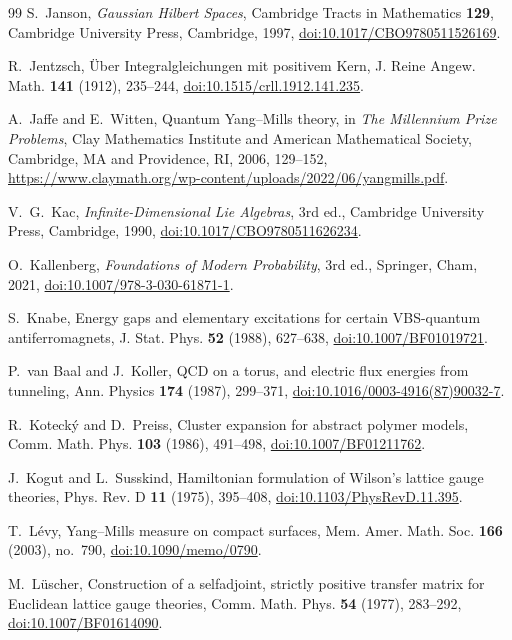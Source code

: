 \begin{thebibliography}{99}
S.~Janson, \emph{Gaussian Hilbert Spaces}, Cambridge Tracts in Mathematics
\textbf{129}, Cambridge University Press, Cambridge, 1997,
\href{https://doi.org/10.1017/CBO9780511526169}{doi:10.1017/CBO9780511526169}.

R.~Jentzsch, \"Uber Integralgleichungen mit positivem Kern, J. Reine Angew.
Math. \textbf{141} (1912), 235--244,
\href{https://doi.org/10.1515/crll.1912.141.235}{doi:10.1515/crll.1912.141.235}.

A.~Jaffe and E.~Witten, Quantum Yang--Mills theory, in \emph{The Millennium
Prize Problems}, Clay Mathematics Institute and American Mathematical
Society, Cambridge, MA and Providence, RI, 2006, 129--152,
\url{https://www.claymath.org/wp-content/uploads/2022/06/yangmills.pdf}.

V.~G.~Kac, \emph{Infinite-Dimensional Lie Algebras}, 3rd ed., Cambridge University Press, Cambridge, 1990, \href{https://doi.org/10.1017/CBO9780511626234}{doi:10.1017/CBO9780511626234}.

O.~Kallenberg, \emph{Foundations of Modern Probability}, 3rd ed., Springer,
Cham, 2021, \href{https://doi.org/10.1007/978-3-030-61871-1}{doi:10.1007/978-3-030-61871-1}.

S.~Knabe, Energy gaps and elementary excitations for certain VBS-quantum antiferromagnets, J. Stat. Phys. \textbf{52} (1988), 627--638, \href{https://doi.org/10.1007/BF01019721}{doi:10.1007/BF01019721}.

P.~van Baal and J.~Koller, QCD on a torus, and electric flux energies from
tunneling, Ann. Physics \textbf{174} (1987), 299--371,
\href{https://doi.org/10.1016/0003-4916(87)90032-7}{doi:10.1016/0003-4916(87)90032-7}.

R.~Koteck\'y and D.~Preiss, Cluster expansion for abstract polymer models, Comm. Math. Phys. \textbf{103} (1986), 491--498, \href{https://doi.org/10.1007/BF01211762}{doi:10.1007/BF01211762}.

J.~Kogut and L.~Susskind, Hamiltonian formulation of Wilson's lattice gauge
theories, Phys. Rev. D \textbf{11} (1975), 395--408,
\href{https://doi.org/10.1103/PhysRevD.11.395}{doi:10.1103/PhysRevD.11.395}.

T.~L\'evy, Yang--Mills measure on compact surfaces, Mem. Amer. Math. Soc. \textbf{166} (2003), no.~790, \href{https://doi.org/10.1090/memo/0790}{doi:10.1090/memo/0790}.

M.~L\"uscher, Construction of a selfadjoint, strictly positive transfer
matrix for Euclidean lattice gauge theories, Comm. Math. Phys. \textbf{54}
(1977), 283--292, \href{https://doi.org/10.1007/BF01614090}{doi:10.1007/BF01614090}.


\end{thebibliography}
